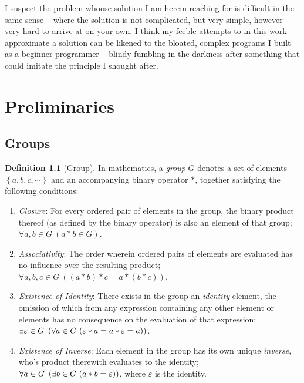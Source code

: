 \documentclass[a4paper,twoside,12pt,openany]{report}
\theoremstyle{plain}
\theoremstyle{definition}
\newtheorem{definition}{Definition}
\theoremstyle{remark}
\begin{document}
I suspect the problem whoose solution I am herein reaching for is difficult in the same sense -- where the solution is not complicated, but very simple, however very hard to arrive at on your own. I think my feeble attempts to in this work approximate a solution can be likened to the bloated, complex programs I built as a beginner programmer -- blindy fumbling in the darkness after something that could imitate the principle I shought after.



%
%


\chapter{Preliminaries}

\section{Groups}

\begin{definition}[Group]
	In mathematics, a \emph{group} \(G\) denotes a set of elements \(\left\{a,b,c,\cdots \right\}\) and an accompanying binary operator \(*\), together satisfying the following conditions:
	\begin{enumerate}
		\item \textit{Closure}: For every ordered pair of elements in the group, the binary product thereof (as defined by the binary operator) is also an element of that group; \(\forall a,b\in G\ \left(a*b\in G\right)\).
		\item \textit{Associativity}: The order wherein ordered pairs of elements are evaluated has no influence over the resulting product; \(\forall a,b,c\in G\ \left((a*b)*c = a*(b*c)\right)\).
		\item \textit{Existence of Identity}: There exists in the group an \textit{identity} element, the omission of which from any expression containing any other element or elements has no consequence on the evaluation of that expression; \(\existss {\varepsilon\in G} {\forall a\in G\ (\varepsilon*a=a*\varepsilon=a)}\).
		\item \textit{Existence of Inverse}: Each element in the group has its own unique \textit{inverse}, who's product therewith evaluates to the identity; \(\foralll{ a\in G} {\exists b\in G\ (a*b=\varepsilon)}\), where \(\varepsilon\) is the identity.
	\end{enumerate}
\end{definition}
\end{document}
